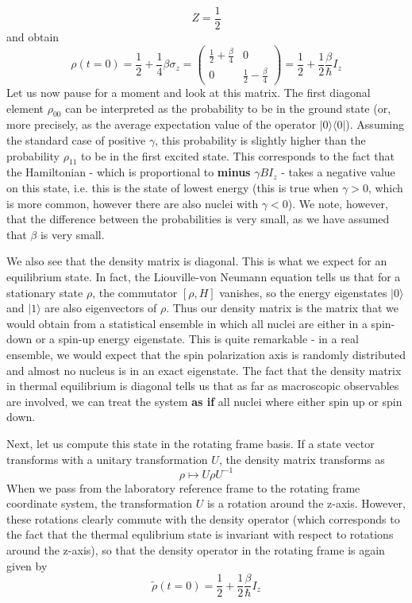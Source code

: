 \documentclass[a4paper, draft]{article}
\theoremstyle{own}
\theoremstyle{remark}
\begin{document}
$$
Z = \frac{1}{2}
$$
and obtain
$$
\rho(t=0) = \frac{1}{2} + \frac{1}{4} \beta \sigma_z =
\begin{pmatrix}
\frac{1}{2} + \frac{\beta}{4} & 0 \\
0 & \frac{1}{2} - \frac{\beta}{4}
\end{pmatrix} = \frac{1}{2} + \frac{1}{2} \frac{\beta}{\hbar} I_z
$$
Let us now pause for a moment and look at this matrix. The first diagonal element $\rho_{00}$ can be interpreted as the probability to be in the ground state (or, more precisely, as the average expectation value of the operator $|0 \rangle \langle 0 |$). Assuming the standard case of positive $\gamma$, this probability is slightly higher than the probability $\rho_{11}$ to be in the first excited state. This corresponds to the fact that the Hamiltonian - which is proportional to {\bf minus} $\gamma B I_z$ - takes a negative value on this state, i.e. this is the state of lowest energy (this is true when $\gamma > 0$, which is more common, however there are also nuclei with $\gamma < 0$). We note, however, that the difference between the probabilities is very small, as we have assumed that $\beta$ is very small. 

We also see that the density matrix is diagonal. This is what we expect for an equilibrium state. In fact, the Liouville-von Neumann equation tells us that for a stationary state $\rho$, the commutator $[\rho, H]$ vanishes, so the energy eigenstates $|0 \rangle$ and $|1 \rangle$ are also eigenvectors of $\rho$. Thus our density matrix is the matrix that we would obtain from a statistical ensemble in which all nuclei are either in a spin-down or a spin-up energy eigenstate. This is quite remarkable - in a real ensemble, we would expect that the spin polarization axis is randomly distributed and almost no nucleus is in an exact eigenstate. The fact that the density matrix in thermal equilibrium is diagonal tells us that as far as macroscopic observables are involved, we can treat the system {\bf as if} all nuclei where either spin up or spin down. 

Next, let us compute this state in the rotating frame basis. If a state vector transforms with a unitary transformation $U$, the density matrix transforms as
$$
\rho \mapsto U \rho U^{-1}
$$
When we pass from the laboratory reference frame to the rotating frame coordinate system, the transformation $U$ is a rotation around the z-axis. However, these rotations clearly commute with the density operator (which corresponds to the fact that the thermal equlibrium state is invariant with respect to rotations around the z-axis), so that the density operator in the rotating frame is again given by
$$
\widetilde{\rho} (t=0) = \frac{1}{2} + \frac{1}{2} \frac{\beta}{\hbar} I_z
$$
\end{document}
